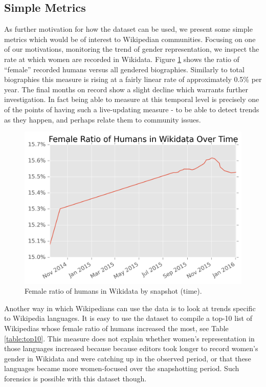 \documentclass[letterpaper]{article}
\begin{document}
\subsection{Simple Metrics}
As further motivation for how the dataset can be used, we present some simple metrics which would be of interest to Wikipedian communities. Focusing on one of our motivations, monitoring the trend of gender representation, we inspect the rate at which women are recorded in Wikidata. Figure \ref{fig:frb} shows the ratio of ``female'' recorded humans versus all gendered biographies. Similarly to total biographies this measure is rising at a fairly linear rate of approximately 0.5\% per year. The final months on record show a slight decline which warrants further investigation. In fact being able to measure at this temporal level is precisely one of the points of having such a live-updating measure - to be able to detect trends as they happen, and perhaps relate them to community issues. 

\begin{figure}
\includegraphics[scale=0.6]{figures/frbwikidata.png} 
\caption{Female ratio of humans in Wikidata by snapshot (time).}
\label{fig:frb}
\end{figure}

Another way in which Wikipedians can use the data is to look at trends specific to Wikipedia languages. It is easy to use the dataset to compile a top-10 list of Wikipedias whose female ratio of humans increased the most, see Table \ref{table:top10}. This measure does not explain whether women's representation in those languages increased because because editors took longer to record women's gender in Wikidata and were catching up in the observed period, or that these languages became more women-focused over the snapshotting period. Such forensics is possible with this dataset though.
\end{document}
